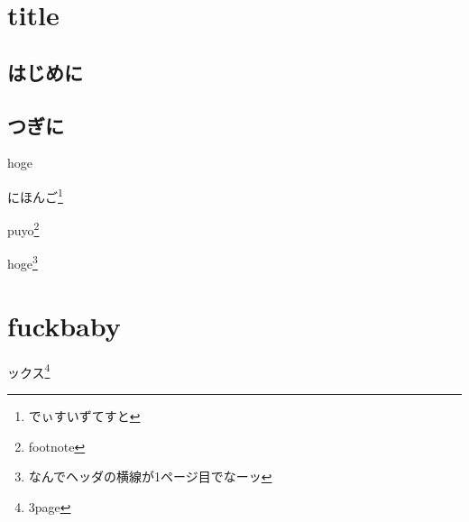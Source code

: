 \documentclass{word}
\author{著者}
\subtitle{fuck}
\begin{document}
\chapter{title}

\section{はじめに}
\section{つぎに}

hoge

にほんご\footnote{でぃすいずてすと}

puyo\footnote{footnote}

\newpage

hoge\footnote{なんでヘッダの横線が1ページ目でなーッ}

\newpage

\chapter*{fuckbaby}


ックス\footnote{3page}
\end{document}
